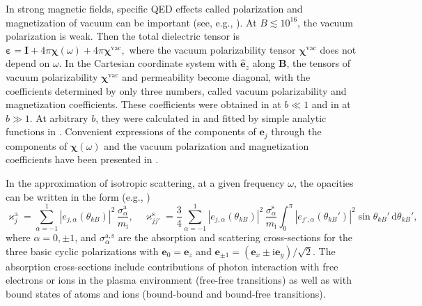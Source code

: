 \documentclass{pos1}
\newcommand{\mion}{m_\mathrm{i}}
\newcommand{\opac}{\varkappa}
\begin{document}
In strong magnetic fields, specific QED effects called polarization
and magnetization of vacuum can be important (see, e.g.,
\cite{PavlovGnedin}). At $B\lesssim 10^{16}$, the vacuum polarization
is weak. Then
the total dielectric tensor is $ \bm{\varepsilon} = \mathbf{I} +
4\pi\bm{\chi}(\omega) + 4\pi\bm{\chi}^\mathrm{vac},$ where the vacuum
polarizability tensor $\bm{\chi}^\mathrm{vac}$ does not depend on
$\omega$. In the Cartesian coordinate system with
$\hat{\mathbf{e}}_{z}$ along $\bm{B}$, the tensors of vacuum
polarizability $\bm{\chi}^\mathrm{vac}$ and permeability
become diagonal, with the coefficients determined by only three
numbers, called vacuum polarizability and magnetization coefficients.
These coefficients were obtained in \cite{Adler} at $b\ll1$ and in
\cite{HH97} at $b\gg1$. At arbitrary $b$, they were
calculated in \cite{KohriYamada} and fitted by simple analytic
functions in \cite{KK}. Convenient expressions of the components of
$\bm{e}_j$ through the components of $\bm{\chi}(\omega)$ and the
vacuum polarization and magnetization coefficients have been presented
in \cite{HoLai03}.

In the approximation of isotropic scattering, at a given
frequency $\omega$, the opacities can be written in the
form (e.g., \cite{KaminkerPS82})
\begin{equation}
   \opac_j^\mathrm{a} = \sum_{\alpha=-1}^1
     |e_{j,\alpha}(\theta_{kB})|^2 \,
        \frac{\sigma_\alpha^\mathrm{a}}{\mion},
\quad
 \opac_{jj'}^\mathrm{s} \!=\!\!
     {\frac34}
\!\!
  \sum_{\alpha=-1}^1 \!\!
     |e_{j,\alpha}(\theta_{kB})|^2 \,
     \frac{\sigma_\alpha^\mathrm{s}}{\mion}\int_0^\pi \!\!\!
       |e_{j',\alpha}(\theta_{kB}')|^2\sin\theta_{kB}'\,\mathrm{d}\theta_{kB}',
\label{opac}
\end{equation}
where $\alpha=0,\pm1$, and $\sigma_\alpha^\mathrm{a,s}$ are the
absorption and scattering cross-sections for the three basic cyclic
polarizations with $\bm{e}_0=\bm{e}_z$ and $\bm{e}_{\pm1} =
(\bm{e}_x\pm\mathrm{i}\bm{e}_y)/\sqrt{2}$. The
absorption cross-sections include contributions of photon interaction with
free electrons or ions in the plasma environment (free-free transitions) as
well as  with bound states of atoms and ions (bound-bound and bound-free
transitions).
\end{document}
